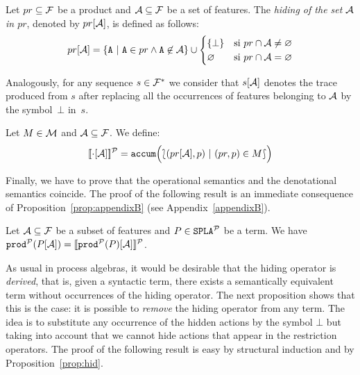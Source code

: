 \bdfn
  Let $pr\subseteq{\cal F}$ be a product and ${\cal A}\subseteq{\cal F}$
  be a set of features. The \emph{hiding of the set ${\cal A}$
    in $pr$}, denoted by $pr[{\cal A}]$, is defined as follows:
  \begin{displaymath}
    pr\hide{\calA} = \{\fA\ |\ \fA\in pr\wedge
    \fA\not\in\calA\}\cup
    \begin{cases}
      \{\bot\} & \mbox{si } pr\cap\calA\neq\emptyset\\
      \emptyset & \mbox{si } pr\cap\calA=\emptyset\\
    \end{cases}
  \end{displaymath}
  
  Analogously, for any sequence $s\in{\cal F}^{*}$ we consider that $s[{\cal A}]$ denotes the
  trace produced from $s$ after replacing all the occurrences of features belonging to ${\cal A}$ by the symbol~$\bot$ in~$s$.
\edfn

\bdfn
  Let $M\in{\cal M}$ and ${\cal A}\subseteq{\cal F}$. We define:
  \begin{displaymath}
    [\![\cdot[{\cal A}]]\!]^{\cal P} = \mathtt{accum}\Bigl(\lbag(pr[{\cal A}],p)\
    |\ (pr,p)\in M\rbag \Bigr)
  \end{displaymath}
\edfn

Finally, we have to prove that the
operational semantics and the denotational semantics coincide. 
%
The proof of the following result is an immediate consequence of Proposition~\ref{prop:appendixB} (see Appendix~\ref{appendixB}).

\bprop\label{prop:hid}Let ${\cal A}\subseteq {\cal F}$ be a subset of features and
  $P\in\mathtt{SPLA{^{\cal P}}}$ be a term. We have $ \mathtt{prod}^{\cal P}(P[{\cal A}])  = [\![\mathtt{prod}^{\cal P}(P)[{\cal A}]]\!]^{\cal P}$.
\eprop

As usual in process algebras, it would be desirable that the hiding operator is \emph{derived}, that is, given a syntactic term, there exists a semantically equivalent term without occurrences of the hiding operator.
The next proposition shows that this is the case: it is possible to \emph{remove} the hiding
operator from any term. The idea is to substitute any occurrence of
the hidden actions by the symbol $\bot$ but taking into account  that we cannot
hide actions that appear in the restriction operators. The proof of the following result is easy by structural induction and by Proposition~\ref{prop:hid}.

